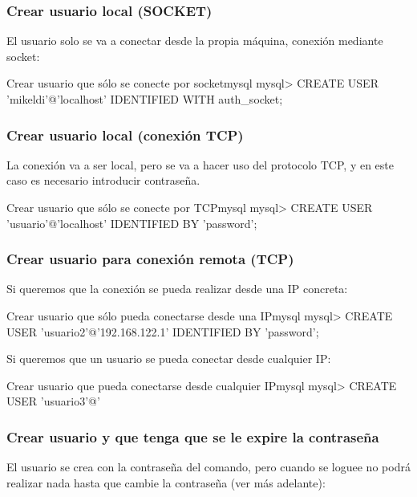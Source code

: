 \subsubsection*{Crear usuario local (SOCKET)}

El usuario solo se va a conectar desde la propia máquina, conexión mediante socket:

\begin{mycode}{Crear usuario que sólo se conecte por socket}{mysql}{}
mysql> CREATE USER 'mikeldi'@'localhost' IDENTIFIED WITH auth_socket;
\end{mycode}


\subsubsection*{Crear usuario local (conexión TCP)}
La conexión va a ser local, pero se va a hacer uso del protocolo TCP, y en este caso es necesario introducir contraseña.

\begin{mycode}{Crear usuario que sólo se conecte por TCP}{mysql}{}
mysql> CREATE USER 'usuario'@'localhost' IDENTIFIED BY 'password';
\end{mycode}


\subsubsection*{Crear usuario para conexión remota (TCP)}
Si queremos que la conexión se pueda realizar desde una IP concreta:

\begin{mycode}{Crear usuario que sólo pueda conectarse desde una IP}{mysql}{}
mysql> CREATE USER 'usuario2'@'192.168.122.1' IDENTIFIED BY 'password';
\end{mycode}

Si queremos que un usuario se pueda conectar desde cualquier IP:

\begin{mycode}{Crear usuario que pueda conectarse desde cualquier IP}{mysql}{}
mysql> CREATE USER 'usuario3'@'%
\end{mycode}


\subsubsection*{Crear usuario y que tenga que se le expire la contraseña}
El usuario se crea con la contraseña del comando, pero cuando se loguee no podrá realizar nada hasta que cambie la contraseña (ver más adelante):

